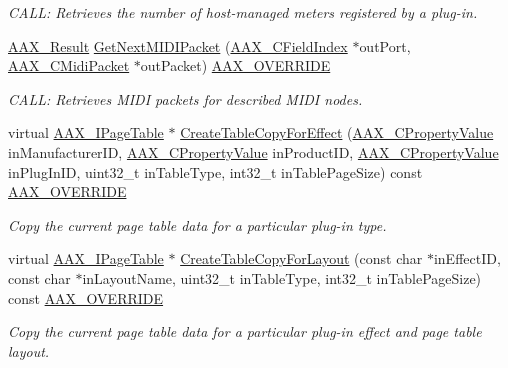\begin{DoxyCompactItemize}
\begin{DoxyCompactList}\small\item\em C\+A\+LL\+: Retrieves the number of host-\/managed meters registered by a plug-\/in. \end{DoxyCompactList}\item 
\mbox{\hyperlink{a00392_a4d8f69a697df7f70c3a8e9b8ee130d2f}{A\+A\+X\+\_\+\+Result}} \mbox{\hyperlink{a01905_a4e47302a86a1494ff21d44a024ae0086}{Get\+Next\+M\+I\+D\+I\+Packet}} (\mbox{\hyperlink{a00392_ae807f8986143820cfb5d6da32165c9c7}{A\+A\+X\+\_\+\+C\+Field\+Index}} $\ast$out\+Port, \mbox{\hyperlink{a01429}{A\+A\+X\+\_\+\+C\+Midi\+Packet}} $\ast$out\+Packet) \mbox{\hyperlink{a00392_ac2f24a5172689ae684344abdcce55463}{A\+A\+X\+\_\+\+O\+V\+E\+R\+R\+I\+DE}}
\begin{DoxyCompactList}\small\item\em C\+A\+LL\+: Retrieves M\+I\+DI packets for described M\+I\+DI nodes. \end{DoxyCompactList}\item 
virtual \mbox{\hyperlink{a01849}{A\+A\+X\+\_\+\+I\+Page\+Table}} $\ast$ \mbox{\hyperlink{a01905_a792b5d6b9d8354e3f6291cfb6ea3b080}{Create\+Table\+Copy\+For\+Effect}} (\mbox{\hyperlink{a00392_ab247c0d8686c14e05cbb567ef276f249}{A\+A\+X\+\_\+\+C\+Property\+Value}} in\+Manufacturer\+ID, \mbox{\hyperlink{a00392_ab247c0d8686c14e05cbb567ef276f249}{A\+A\+X\+\_\+\+C\+Property\+Value}} in\+Product\+ID, \mbox{\hyperlink{a00392_ab247c0d8686c14e05cbb567ef276f249}{A\+A\+X\+\_\+\+C\+Property\+Value}} in\+Plug\+In\+ID, uint32\+\_\+t in\+Table\+Type, int32\+\_\+t in\+Table\+Page\+Size) const \mbox{\hyperlink{a00392_ac2f24a5172689ae684344abdcce55463}{A\+A\+X\+\_\+\+O\+V\+E\+R\+R\+I\+DE}}
\begin{DoxyCompactList}\small\item\em Copy the current page table data for a particular plug-\/in type. \end{DoxyCompactList}\item 
virtual \mbox{\hyperlink{a01849}{A\+A\+X\+\_\+\+I\+Page\+Table}} $\ast$ \mbox{\hyperlink{a01905_a997e7aecbf23facf4768affabed1e6fe}{Create\+Table\+Copy\+For\+Layout}} (const char $\ast$in\+Effect\+ID, const char $\ast$in\+Layout\+Name, uint32\+\_\+t in\+Table\+Type, int32\+\_\+t in\+Table\+Page\+Size) const \mbox{\hyperlink{a00392_ac2f24a5172689ae684344abdcce55463}{A\+A\+X\+\_\+\+O\+V\+E\+R\+R\+I\+DE}}
\begin{DoxyCompactList}\small\item\em Copy the current page table data for a particular plug-\/in effect and page table layout. \end{DoxyCompactList}\item 

\end{DoxyCompactItemize}

